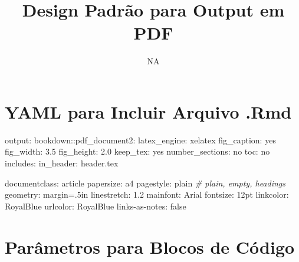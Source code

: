 \documentclass[
  12pt,
  a4paper,
]{article}
\title{Design Padrão para Output em PDF}
\subtitle{NA}
\author{}
\date{\vspace{-2.5em}}
\newenvironment{Shaded}{\begin{snugshade}}{\end{snugshade}}
\newcommand{\CommentTok}[1]{\textcolor[rgb]{0.56,0.35,0.01}{\textit{#1}}}
\newcommand{\FloatTok}[1]{\textcolor[rgb]{0.00,0.00,0.81}{#1}}
\newcommand{\NormalTok}[1]{#1}
\newcommand{\OtherTok}[1]{\textcolor[rgb]{0.56,0.35,0.01}{#1}}
\newcommand{\SpecialCharTok}[1]{\textcolor[rgb]{0.00,0.00,0.00}{#1}}
\begin{document}
\maketitle

\hypertarget{yaml-para-incluir-arquivo-.rmd}{%
\section{YAML para Incluir Arquivo .Rmd}\label{yaml-para-incluir-arquivo-.rmd}}

\begin{Shaded}
\begin{Highlighting}[]
\NormalTok{output}\SpecialCharTok{:}
\NormalTok{  bookdown}\SpecialCharTok{::}\NormalTok{pdf\_document2}\SpecialCharTok{:}
\NormalTok{    latex\_engine}\SpecialCharTok{:}\NormalTok{ xelatex}
\NormalTok{    fig\_caption}\SpecialCharTok{:}\NormalTok{ yes}
\NormalTok{    fig\_width}\SpecialCharTok{:} \FloatTok{3.5}
\NormalTok{    fig\_height}\SpecialCharTok{:} \FloatTok{2.0}
\NormalTok{    keep\_tex}\SpecialCharTok{:}\NormalTok{ yes}
\NormalTok{    number\_sections}\SpecialCharTok{:}\NormalTok{ no}
\NormalTok{    toc}\SpecialCharTok{:}\NormalTok{ no}
\NormalTok{    includes}\SpecialCharTok{:}
\NormalTok{      in\_header}\SpecialCharTok{:}\NormalTok{ header.tex}
      
\NormalTok{documentclass}\SpecialCharTok{:}\NormalTok{ article}
\NormalTok{papersize}\SpecialCharTok{:}\NormalTok{ a4}
\NormalTok{pagestyle}\SpecialCharTok{:}\NormalTok{ plain  }\CommentTok{\# plain, empty, headings}
\NormalTok{geometry}\SpecialCharTok{:}\NormalTok{ margin}\OtherTok{=}\NormalTok{.5in}
\NormalTok{linestretch}\SpecialCharTok{:} \FloatTok{1.2}
\NormalTok{mainfont}\SpecialCharTok{:}\NormalTok{ Arial}
\NormalTok{fontsize}\SpecialCharTok{:}\NormalTok{ 12pt}
\NormalTok{linkcolor}\SpecialCharTok{:}\NormalTok{ RoyalBlue}
\NormalTok{urlcolor}\SpecialCharTok{:}\NormalTok{ RoyalBlue}
\NormalTok{links}\SpecialCharTok{{-}}\NormalTok{as}\SpecialCharTok{{-}}\NormalTok{notes}\SpecialCharTok{:}\NormalTok{ false}
\end{Highlighting}
\end{Shaded}

\hypertarget{paruxe2metros-para-blocos-de-cuxf3digo}{%
\section{Parâmetros para Blocos de Código}\label{paruxe2metros-para-blocos-de-cuxf3digo}}
\end{document}

